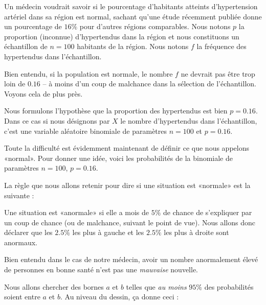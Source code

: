 Un médecin voudrait savoir si le pourcentage d'habitants atteints d'hypertension artériel dans sa région est normal, sachant qu'une étude récemment publiée donne un pourcentage de \( 16\%\) pour d'autres régions comparables. Nous notons \( p\) la proportion (inconnue) d'hypertendus dans la région et nous constituons un échantillon de \( n=100\) habitants de la région. Nous notons \( f\) la fréquence des hypertendus dans l'échantillon.

Bien entendu, si la population est normale, le nombre \( f\) ne devrait pas être trop loin de \( 0.16\) -- à moins d'un coup de malchance dans la sélection de l'échantillon. Voyons cela de plus près.

Nous formulons l'hypothèse que la proportion des hypertendus est bien \( p=0.16\). Dans ce cas si nous désignons par \( X\) le nombre d'hypertendus dans l'échantillon, c'est une variable aléatoire binomiale de paramètres \( n=100\) et \( p=0.16\).

Toute la difficulté est évidemment maintenant de définir ce que nous appelons «normal». Pour donner une idée, voici les probabilités de la binomiale de paramètres \( n=100\), \( p=0.16\).

\begin{center}

\end{center}

La règle que nous allons retenir pour dire si une situation est «normale» est la suivante :
\begin{Aretenir}
    Une situation est «anormale» si elle a mois de \( 5\%\) de chance de s'expliquer par un coup de chance (ou de malchance, suivant le point de vue). Nous allons donc déclarer que les \( 2.5\%\) les plus à gauche et les \( 2.5\%\) les plus à droite sont anormaux.
\end{Aretenir}
Bien entendu dans le cas de notre médecin, avoir un nombre anormalement élevé de personnes en bonne santé n'est pas une \emph{mauvaise} nouvelle. 

Nous allons chercher des bornes \( a\) et \( b\) telles que \emph{au moins} \( 95\%\) des probabilités soient entre \( a\) et \( b\). Au niveau du dessin, ça donne ceci :


